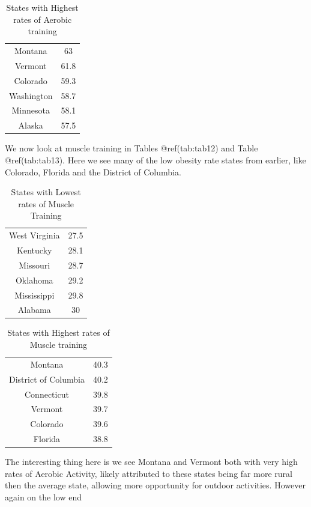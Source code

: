 \documentclass[
]{article}
\begin{document}
\begin{table}[H]

\caption{\label{tab:tab11}States with Highest rates of Aerobic training}
\centering
\begin{tabular}[t]{cc}
\toprule
Montana & 63\\
Vermont & 61.8\\
Colorado & 59.3\\
Washington & 58.7\\
Minnesota & 58.1\\
\addlinespace
Alaska & 57.5\\
\bottomrule
\end{tabular}
\end{table}

We now look at muscle training in Tables @ref(tab:tab12) and Table
@ref(tab:tab13). Here we see many of the low obesity rate states from
earlier, like Colorado, Florida and the District of Columbia.

\begin{table}[H]

\caption{\label{tab:tab12}States with Lowest rates of Muscle Training}
\centering
\begin{tabular}[t]{cc}
\toprule
West Virginia & 27.5\\
Kentucky & 28.1\\
Missouri & 28.7\\
Oklahoma & 29.2\\
Mississippi & 29.8\\
\addlinespace
Alabama & 30\\
\bottomrule
\end{tabular}
\end{table}

\begin{table}[H]

\caption{\label{tab:tab13}States with Highest rates of Muscle training}
\centering
\begin{tabular}[t]{cc}
\toprule
Montana & 40.3\\
District of Columbia & 40.2\\
Connecticut & 39.8\\
Vermont & 39.7\\
Colorado & 39.6\\
\addlinespace
Florida & 38.8\\
\bottomrule
\end{tabular}
\end{table}

The interesting thing here is we see Montana and Vermont both with very
high rates of Aerobic Activity, likely attributed to these states being
far more rural then the average state, allowing more opportunity for
outdoor activities. However again on the low end \newpage
\end{document}
